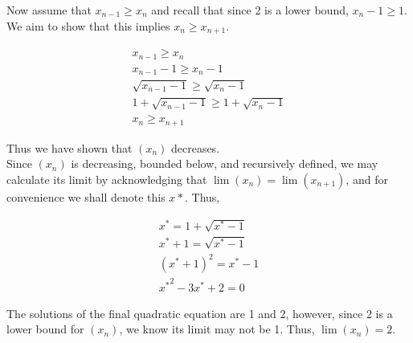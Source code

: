 \documentclass[paper=a4, fontsize=11pt]{scrartcl} %
\numberwithin{equation}{section} %
\numberwithin{figure}{section} %
\numberwithin{table}{section} %
\begin{document}
Now assume that $x_{n-1} \geq x_n$ and recall that since 2 is a lower bound, $x_n - 1 \geq 1$. We aim to show that this implies $x_n \geq x_{n+1}$.

\begin{gather*}
x_{n-1} \geq x_n\\
x_{n-1} - 1 \geq x_n - 1\\
\sqrt{x_{n-1} - 1} \geq \sqrt{x_n - 1}\\
1 + \sqrt{x_{n-1} - 1} \geq 1 + \sqrt{x_n - 1}\\
x_n \geq x_{n+1}
\end{gather*}

Thus we have shown that $(x_n)$ decreases.\\

Since $(x_n)$ is decreasing, bounded below, and recursively defined, we may calculate its limit by acknowledging that $\lim(x_n) = \lim(x_{n+1})$, and for convenience we shall denote this $x*$. Thus,

\begin{gather*}
x^* = 1 + \sqrt{x^* - 1}\\
x^* + 1 = \sqrt{x^* - 1}\\
(x^* + 1)^2 = x^* - 1\\
{x^*}^2 - 3x^* + 2 = 0
\end{gather*}

The solutions of the final quadratic equation are 1 and 2, however, since 2 is a lower bound for $(x_n)$, we know its limit may not be 1. Thus, $\lim(x_n) = 2$.
\end{document}
